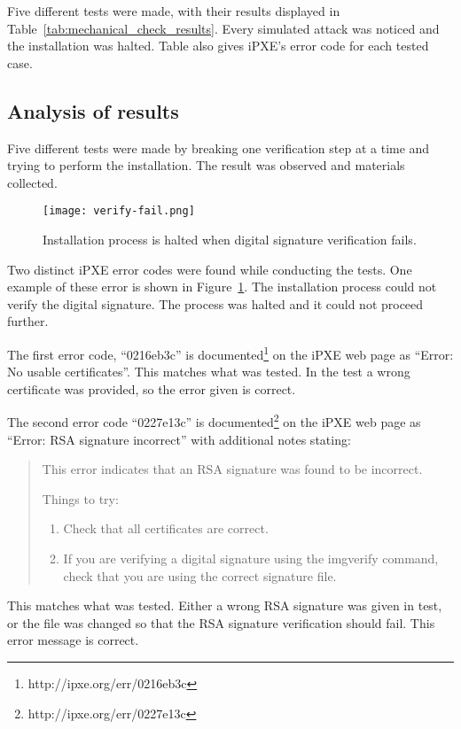 Five different tests were made, with their results displayed in
Table~\ref{tab:mechanical_check_results}. Every simulated attack was
noticed and the installation was halted. Table also gives iPXE's error
code for each tested case.


\subsection{Analysis of results}

Five different tests were made by breaking one verification step at a
time and trying to perform the installation. The result was observed
and materials collected.

\begin{figure}[h]
  \caption{Installation process is halted when digital signature
    verification fails.\label{fig:verify-fail}}
  \texttt{[image: verify-fail.png]}
\end{figure}

Two distinct iPXE error codes were found while conducting the
tests. One example of these error is shown in
Figure~\ref{fig:verify-fail}. The installation process could not
verify the digital signature. The process was halted and it could not
proceed further.

The first error code, ``0216eb3c'' is
documented\footnote{http://ipxe.org/err/0216eb3c} on the iPXE web page
as ``Error: No usable certificates''. This matches what was tested. In
the test a wrong certificate was provided, so the error given is
correct.

The second error code ``0227e13c'' is
documented\footnote{http://ipxe.org/err/0227e13c} on the iPXE web page
as ``Error: RSA signature incorrect'' with additional notes stating:

\begin{quote}
This error indicates that an RSA signature was found to be incorrect.

Things to try:

\begin{enumerate}
\item Check that all certificates are correct.
\item If you are verifying a digital signature using the imgverify
  command, check that you are using the correct signature file.
\end{enumerate}
\end{quote}

This matches what was tested. Either a wrong RSA signature was given
in test, or the file was changed so that the RSA signature
verification should fail. This error message is correct.

